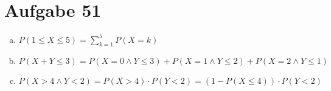 \section{Aufgabe 51}

\begin{enumerate}[(a)]
    \item $P(1 \leq X \leq 5) = \sum_{k = 1}^5P(X = k)$
    \item $P(X + Y \leq 3) = P(X = 0 \land Y \leq 3) + P(X = 1 \land Y \leq 2) + P(X = 2 \land Y \leq 1)$
    \item $P(X > 4 \land Y < 2) = P(X > 4) \cdot P(Y < 2) = (1 - P(X \leq 4)) \cdot P(Y < 2)$
\end{enumerate}
